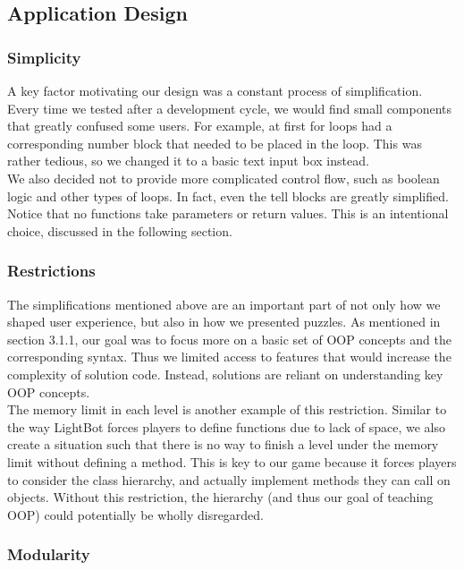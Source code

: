 \documentclass[12pt,notitlepage]{article}
\begin{document}
\subsection{Application Design}

\subsubsection{Simplicity}

A key factor motivating our design was a constant process of 
simplification. Every time we tested after a development cycle, we would 
find small components that greatly confused some users. For example,
at first for loops had a corresponding number block that needed to be
placed in the loop. This was rather tedious, so we changed it to a basic
text input box instead.\\

We also decided not to provide more complicated control flow, such as
boolean logic and other types of loops. In fact, even the tell blocks
are greatly simplified. Notice that no functions take parameters or
return values. This is an intentional choice, discussed in the following
section.

\subsubsection{Restrictions}

The simplifications mentioned above are an important part of not only how 
we shaped user experience, but also in how we presented puzzles. As mentioned 
in section 3.1.1, our goal was to focus more on a basic set of OOP concepts 
and the corresponding syntax. Thus we limited access to features that would 
increase the complexity of solution code. Instead, solutions are reliant on understanding key OOP concepts.\\

The memory limit in each level is another example of this restriction. Similar
to the way LightBot forces players to define functions due to lack of space,
we also create a situation such that there is no way to finish a level under
the memory limit without defining a method. This is key to our game because it
forces players to consider the class hierarchy, and actually implement methods
they can call on objects. Without this restriction, the hierarchy (and thus our
goal of teaching OOP) could potentially be wholly disregarded.

\subsubsection{Modularity}
\end{document}

